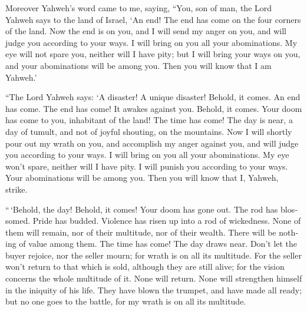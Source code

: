 \begin{paracol}{2}
\begin{otherlanguage}{english}
 Moreover Yahweh's word came to me, saying, 
``You, son of man, the Lord Yahweh says to the land of Israel, `An end!
The end has come on the four corners of the land.  Now the
end is on you, and I will send my anger on you, and will judge you
according to your ways. I will bring on you all your abominations.
 My eye will not spare you, neither will I have pity; but
I will bring your ways on you, and your abominations will be among you.
Then you will know that I am Yahweh.'

 ``The Lord Yahweh says: `A disaster! A unique disaster!
Behold, it comes.  An end has come. The end has come! It
awakes against you. Behold, it comes.  Your doom has come
to you, inhabitant of the land! The time has come! The day is near, a
day of tumult, and not of joyful shouting, on the mountains.
 Now I will shortly pour out my wrath on you, and
accomplish my anger against you, and will judge you according to your
ways. I will bring on you all your abominations.  My eye
won't spare, neither will I have pity. I will punish you according to
your ways. Your abominations will be among you. Then you will know that
I, Yahweh, strike.

 ``\,`Behold, the day! Behold, it comes! Your doom has
gone out. The rod has blossomed. Pride has budded. 
Violence has risen up into a rod of wickedness. None of them will
remain, nor of their multitude, nor of their wealth. There will be
nothing of value among them.  The time has come! The day
draws near. Don't let the buyer rejoice, nor the seller mourn; for wrath
is on all its multitude.  For the seller won't return to
that which is sold, although they are still alive; for the vision
concerns the whole multitude of it. None will return. None will
strengthen himself in the iniquity of his life.  They
have blown the trumpet, and have made all ready; but no one goes to the
battle, for my wrath is on all its multitude.


\end{otherlanguage}
\end{paracol}
